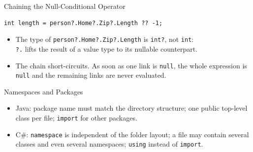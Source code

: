 \begin{solutionframe}{Chaining the Null-Conditional Operator}
  \begin{lstlisting}[basicstyle=\scriptsize\ttfamily]
int length = person?.Home?.Zip?.Length ?? -1;
  \end{lstlisting}
  \begin{itemize}
    \item The type of \texttt{person?.Home?.Zip?.Length} is \texttt{int?}, not
      \texttt{int}:\\
       \texttt{?.} lifts the result of a value type to its
      nullable counterpart.
    \item The chain short-circuits. As soon as one link is \texttt{null}, the
      whole expression is \texttt{null} and the remaining links are never
      evaluated.
  \end{itemize}
  \vspace{3ex}

  \vspace{1ex}

\end{solutionframe}

\begin{frame}{Namespaces and Packages}
  \begin{itemize}
    \item Java: package name must match the directory structure; one
      public top-level class per file; \texttt{import} for other packages.
    \item C\#: \texttt{namespace} is independent of the folder layout;
      a file may contain several classes and even several namespaces;
      \texttt{using} instead of \texttt{import}.
  \end{itemize}
\end{frame}

